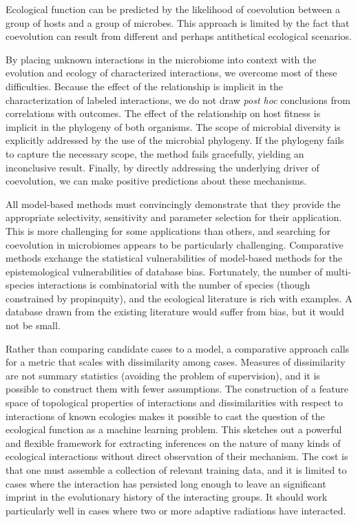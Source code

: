 Ecological function can be predicted by the likelihood of coevolution between a group of hosts and a group of microbes. \cite{hafner1994disparate,hommola2009permutation} This approach is limited by the fact that coevolution can result from different and perhaps antithetical ecological scenarios. \cite{van1973new,janzen1980coevolution,bergstrom2003red}

By placing unknown interactions in the microbiome into context with the evolution and ecology of characterized interactions, we overcome most of these difficulties. Because the effect of the relationship is implicit in the characterization of labeled interactions, we do not draw {\em post hoc} conclusions from correlations with outcomes. The effect of the relationship on host fitness is implicit in the phylogeny of both organisms. The scope of microbial diversity is explicitly addressed by the use of the microbial phylogeny. If the phylogeny fails to capture the necessary scope, the method fails gracefully, yielding an inconclusive result. Finally, by directly addressing the underlying driver of coevolution, we can make positive predictions about these mechanisms.

All model-based methods must convincingly demonstrate that they provide the appropriate selectivity, sensitivity and parameter selection for their application. This is more challenging for some applications than others, and searching for coevolution in microbiomes appears to be particularly challenging. Comparative methods exchange the statistical vulnerabilities of model-based methods for the epistemological vulnerabilities of database bias. Fortunately, the number of multi-species interactions is combinatorial with the number of species (though constrained by propinquity), and the ecological literature is rich with examples. A database drawn from the existing literature would suffer from bias, but it would not be small.

Rather than comparing candidate cases to a model, a comparative approach calls for a metric that scales with dissimilarity among cases. Measures of dissimilarity are not summary statistics (avoiding the problem of supervision), and it is possible to construct them with fewer assumptions. The construction of a feature space of topological properties of interactions and dissimilarities with respect to interactions of known ecologies makes it possible to cast the question of the ecological function as a machine learning problem. This sketches out a powerful and flexible framework for extracting inferences on the nature of many kinds of ecological interactions without direct observation of their mechanism. The cost is that one must assemble a collection of relevant training data, and it is limited to cases where the interaction has persisted long enough to leave an significant imprint in the evolutionary history of the interacting groups. It should work particularly well in cases where two or more adaptive radiations have interacted.

